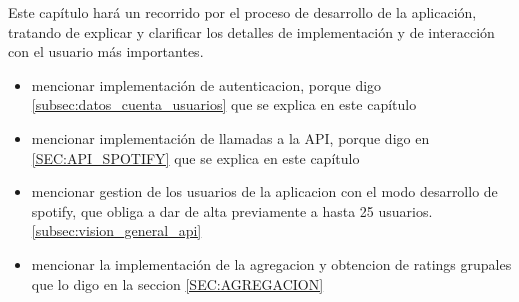 Este capítulo hará un recorrido por el proceso de desarrollo de la aplicación, tratando de explicar y clarificar los 
detalles de implementación y de interacción con el usuario más importantes.

\begin{itemize}
    \item mencionar implementación de autenticacion, porque digo \ref{subsec:datos_cuenta_usuarios} que se explica en este capítulo
    \item mencionar implementación de llamadas a la API, porque digo en \ref{SEC:API_SPOTIFY} que se explica en este capítulo
    \item mencionar gestion de los usuarios de la aplicacion con el modo desarrollo de spotify,
    que obliga a dar de alta previamente a hasta 25 usuarios. \ref{subsec:vision_general_api}
    \item mencionar la implementación de la agregacion y obtencion de ratings grupales que lo digo en la seccion 
    \ref{SEC:AGREGACION}
\end{itemize}